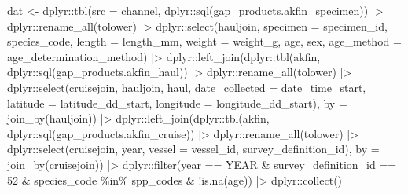 \documentclass[
  letterpaper,
  oneside,
  open=any]{scrbook}
\newenvironment{Shaded}{\begin{snugshade}}{\end{snugshade}}
\newcommand{\AttributeTok}[1]{\textcolor[rgb]{0.40,0.45,0.13}{#1}}
\newcommand{\DecValTok}[1]{\textcolor[rgb]{0.68,0.00,0.00}{#1}}
\newcommand{\FunctionTok}[1]{\textcolor[rgb]{0.28,0.35,0.67}{#1}}
\newcommand{\NormalTok}[1]{\textcolor[rgb]{0.00,0.23,0.31}{#1}}
\newcommand{\OtherTok}[1]{\textcolor[rgb]{0.00,0.23,0.31}{#1}}
\newcommand{\SpecialCharTok}[1]{\textcolor[rgb]{0.37,0.37,0.37}{#1}}
\newcommand{\StringTok}[1]{\textcolor[rgb]{0.13,0.47,0.30}{#1}}
\begin{document}
\begin{Shaded}
\begin{Highlighting}[]
\NormalTok{dat }\OtherTok{\textless{}{-}}\NormalTok{ dplyr}\SpecialCharTok{::}\FunctionTok{tbl}\NormalTok{(}\AttributeTok{src =}\NormalTok{ channel, dplyr}\SpecialCharTok{::}\FunctionTok{sql}\NormalTok{(}\StringTok{\textquotesingle{}gap\_products.akfin\_specimen\textquotesingle{}}\NormalTok{)) }\SpecialCharTok{|\textgreater{}} 
\NormalTok{    dplyr}\SpecialCharTok{::}\FunctionTok{rename\_all}\NormalTok{(tolower) }\SpecialCharTok{|\textgreater{}} 
\NormalTok{    dplyr}\SpecialCharTok{::}\FunctionTok{select}\NormalTok{(hauljoin, }\AttributeTok{specimen =}\NormalTok{ specimen\_id, species\_code, }\AttributeTok{length =}\NormalTok{ length\_mm, }
                  \AttributeTok{weight =}\NormalTok{ weight\_g, age, sex, }\AttributeTok{age\_method =}\NormalTok{ age\_determination\_method) }\SpecialCharTok{|\textgreater{}} 
\NormalTok{    dplyr}\SpecialCharTok{::}\FunctionTok{left\_join}\NormalTok{(dplyr}\SpecialCharTok{::}\FunctionTok{tbl}\NormalTok{(akfin, dplyr}\SpecialCharTok{::}\FunctionTok{sql}\NormalTok{(}\StringTok{\textquotesingle{}gap\_products.akfin\_haul\textquotesingle{}}\NormalTok{)) }\SpecialCharTok{|\textgreater{}}
\NormalTok{                       dplyr}\SpecialCharTok{::}\FunctionTok{rename\_all}\NormalTok{(tolower) }\SpecialCharTok{|\textgreater{}} 
\NormalTok{                       dplyr}\SpecialCharTok{::}\FunctionTok{select}\NormalTok{(cruisejoin, hauljoin, haul, }\AttributeTok{date\_collected =}\NormalTok{ date\_time\_start, }
                                     \AttributeTok{latitude =}\NormalTok{ latitude\_dd\_start, }\AttributeTok{longitude =}\NormalTok{ longitude\_dd\_start),}
                     \AttributeTok{by =} \FunctionTok{join\_by}\NormalTok{(hauljoin)) }\SpecialCharTok{|\textgreater{}} 
\NormalTok{    dplyr}\SpecialCharTok{::}\FunctionTok{left\_join}\NormalTok{(dplyr}\SpecialCharTok{::}\FunctionTok{tbl}\NormalTok{(akfin, dplyr}\SpecialCharTok{::}\FunctionTok{sql}\NormalTok{(}\StringTok{\textquotesingle{}gap\_products.akfin\_cruise\textquotesingle{}}\NormalTok{)) }\SpecialCharTok{|\textgreater{}}
\NormalTok{                       dplyr}\SpecialCharTok{::}\FunctionTok{rename\_all}\NormalTok{(tolower) }\SpecialCharTok{|\textgreater{}} 
\NormalTok{                       dplyr}\SpecialCharTok{::}\FunctionTok{select}\NormalTok{(cruisejoin, year, }\AttributeTok{vessel =}\NormalTok{ vessel\_id, survey\_definition\_id),}
                     \AttributeTok{by =} \FunctionTok{join\_by}\NormalTok{(cruisejoin)) }\SpecialCharTok{|\textgreater{}} 
\NormalTok{    dplyr}\SpecialCharTok{::}\FunctionTok{filter}\NormalTok{(year }\SpecialCharTok{==}\NormalTok{ YEAR }\SpecialCharTok{\&}
\NormalTok{             survey\_definition\_id }\SpecialCharTok{==} \DecValTok{52} \SpecialCharTok{\&} 
\NormalTok{             species\_code }\SpecialCharTok{\%in\%}\NormalTok{ spp\_codes }\SpecialCharTok{\&}
             \SpecialCharTok{!}\FunctionTok{is.na}\NormalTok{(age)) }\SpecialCharTok{|\textgreater{}} 
\NormalTok{    dplyr}\SpecialCharTok{::}\FunctionTok{collect}\NormalTok{()}
\end{Highlighting}
\end{Shaded}
\end{document}
